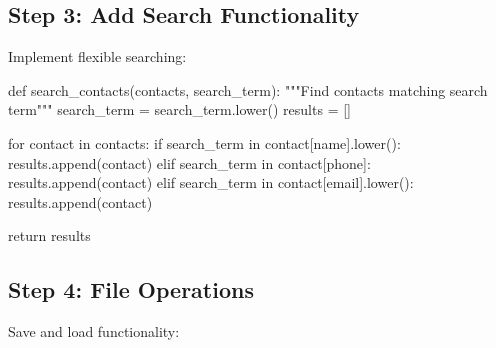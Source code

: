 \documentclass[
  letterpaper,
  DIV=11,
  numbers=noendperiod,
  oneside]{scrreprt}
\newenvironment{Shaded}{}{}
\newcommand{\CommentTok}[1]{\textcolor[rgb]{0.42,0.45,0.49}{#1}}
\newcommand{\ControlFlowTok}[1]{\textcolor[rgb]{0.84,0.23,0.29}{#1}}
\newcommand{\KeywordTok}[1]{\textcolor[rgb]{0.84,0.23,0.29}{#1}}
\newcommand{\NormalTok}[1]{\textcolor[rgb]{0.14,0.16,0.18}{#1}}
\newcommand{\OperatorTok}[1]{\textcolor[rgb]{0.14,0.16,0.18}{#1}}
\newcommand{\StringTok}[1]{\textcolor[rgb]{0.01,0.18,0.38}{#1}}
\begin{document}
\subsection{Step 3: Add Search
Functionality}\label{step-3-add-search-functionality}

Implement flexible searching:

\begin{Shaded}
\begin{Highlighting}[]
\KeywordTok{def}\NormalTok{ search\_contacts(contacts, search\_term):}
    \CommentTok{"""Find contacts matching search term"""}
\NormalTok{    search\_term }\OperatorTok{=}\NormalTok{ search\_term.lower()}
\NormalTok{    results }\OperatorTok{=}\NormalTok{ []}
    
    \ControlFlowTok{for}\NormalTok{ contact }\KeywordTok{in}\NormalTok{ contacts:}
        \ControlFlowTok{if}\NormalTok{ search\_term }\KeywordTok{in}\NormalTok{ contact[}\StringTok{\textquotesingle{}name\textquotesingle{}}\NormalTok{].lower():}
\NormalTok{            results.append(contact)}
        \ControlFlowTok{elif}\NormalTok{ search\_term }\KeywordTok{in}\NormalTok{ contact[}\StringTok{\textquotesingle{}phone\textquotesingle{}}\NormalTok{]:}
\NormalTok{            results.append(contact)}
        \ControlFlowTok{elif}\NormalTok{ search\_term }\KeywordTok{in}\NormalTok{ contact[}\StringTok{\textquotesingle{}email\textquotesingle{}}\NormalTok{].lower():}
\NormalTok{            results.append(contact)}
    
    \ControlFlowTok{return}\NormalTok{ results}
\end{Highlighting}
\end{Shaded}

\subsection{Step 4: File Operations}\label{step-4-file-operations}

Save and load functionality:
\end{document}

